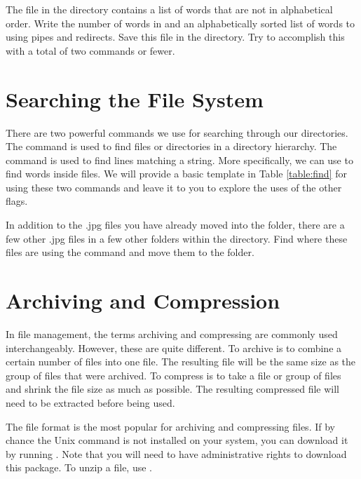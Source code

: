 \begin{problem}
The  file in the  directory contains a list of words that are not in alphabetical order. Write the number of words in  and an alphabetically sorted list of words to  using pipes and redirects. Save this file in the  directory. Try to accomplish this with a total of two commands or fewer.
\end{problem}


\section*{Searching the File System}
There are two powerful commands we use for searching through our directories. The  command is used to find files or directories in a directory hierarchy. The  command is used to find lines matching a string. More specifically, we can use  to find words inside files. We will provide a basic template in Table \ref{table:find} for using these two commands and leave it to you to explore the uses of the other flags.

\begin{problem}
In addition to the .jpg files you have already moved into the  folder, there are a few other .jpg files in a few other folders within the  directory. Find where these files are using the  command and move them to the  folder.
\end{problem}

\section*{Archiving and Compression}
In file management, the terms archiving and compressing are commonly used interchangeably. However, these are quite different. To archive is to combine a certain number of files into one file. The resulting file will be the same size as the group of files that were archived.
To compress is to take a file or group of files and shrink the file size as much as possible. The resulting compressed file will need to be extracted before being used.

The  file format is the most popular for archiving and compressing files. If by chance the  Unix command is not installed on your system, you can download it by running . Note that you will need to have administrative rights to download this package. To unzip a file, use .

